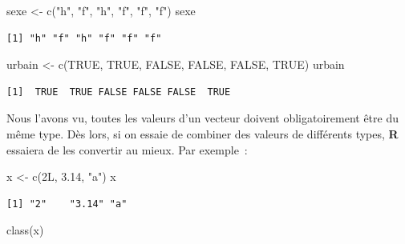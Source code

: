 \documentclass[
  letterpaper,
  DIV=11,
  numbers=noendperiod,
  oneside]{scrreprt}
\newenvironment{Shaded}{\begin{snugshade}}{\end{snugshade}}
\newcommand{\ConstantTok}[1]{\textcolor[rgb]{0.56,0.35,0.01}{#1}}
\newcommand{\FloatTok}[1]{\textcolor[rgb]{0.68,0.00,0.00}{#1}}
\newcommand{\FunctionTok}[1]{\textcolor[rgb]{0.28,0.35,0.67}{#1}}
\newcommand{\NormalTok}[1]{\textcolor[rgb]{0.00,0.23,0.31}{#1}}
\newcommand{\OtherTok}[1]{\textcolor[rgb]{0.00,0.23,0.31}{#1}}
\newcommand{\StringTok}[1]{\textcolor[rgb]{0.13,0.47,0.30}{#1}}
\begin{document}
\begin{Shaded}
\begin{Highlighting}[]
\NormalTok{sexe }\OtherTok{\textless{}{-}} \FunctionTok{c}\NormalTok{(}\StringTok{"h"}\NormalTok{, }\StringTok{"f"}\NormalTok{, }\StringTok{"h"}\NormalTok{, }\StringTok{"f"}\NormalTok{, }\StringTok{"f"}\NormalTok{, }\StringTok{"f"}\NormalTok{)}
\NormalTok{sexe}
\end{Highlighting}
\end{Shaded}

\begin{verbatim}
[1] "h" "f" "h" "f" "f" "f"
\end{verbatim}

\begin{Shaded}
\begin{Highlighting}[]
\NormalTok{urbain }\OtherTok{\textless{}{-}} \FunctionTok{c}\NormalTok{(}\ConstantTok{TRUE}\NormalTok{, }\ConstantTok{TRUE}\NormalTok{, }\ConstantTok{FALSE}\NormalTok{, }\ConstantTok{FALSE}\NormalTok{, }\ConstantTok{FALSE}\NormalTok{, }\ConstantTok{TRUE}\NormalTok{)}
\NormalTok{urbain}
\end{Highlighting}
\end{Shaded}

\begin{verbatim}
[1]  TRUE  TRUE FALSE FALSE FALSE  TRUE
\end{verbatim}

Nous l'avons vu, toutes les valeurs d'un vecteur doivent obligatoirement
être du même type. Dès lors, si on essaie de combiner des valeurs de
différents types, \textbf{R} essaiera de les convertir au mieux. Par
exemple~:

\begin{Shaded}
\begin{Highlighting}[]
\NormalTok{x }\OtherTok{\textless{}{-}} \FunctionTok{c}\NormalTok{(2L, }\FloatTok{3.14}\NormalTok{, }\StringTok{"a"}\NormalTok{)}
\NormalTok{x}
\end{Highlighting}
\end{Shaded}

\begin{verbatim}
[1] "2"    "3.14" "a"   
\end{verbatim}

\begin{Shaded}
\begin{Highlighting}[]
\FunctionTok{class}\NormalTok{(x)}
\end{Highlighting}
\end{Shaded}
\end{document}
